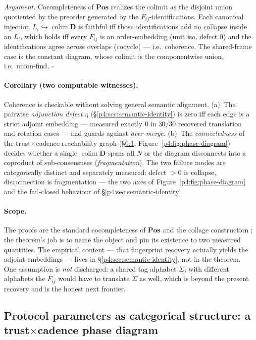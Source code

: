 \documentclass{article}
\begin{document}
\emph{Argument.} Cocompleteness of $\mathbf{Pos}$ realizes the colimit as the
disjoint union quotiented by the preorder generated by the
$F_{ij}$-identifications. Each canonical injection
$L_i\hookrightarrow\operatorname{colim}\mathbf{D}$ is faithful iff those
identifications add no collapse inside an $L_i$, which holds iff every $F_{ij}$
is an order-embedding (unit iso, defect $0$) and the identifications agree
across overlaps (cocycle) --- i.e.\ coherence. The shared-frame case is the
constant diagram, whose colimit is the componentwise union, i.e.\ union-find.
\hfill$\square$

\paragraph{Corollary (two computable witnesses).} Coherence is checkable
without solving general semantic alignment. (a)~The pairwise \emph{adjunction
defect} $\eta$ (\S\ref{p4:sec:semantic-identity}) is zero iff each edge is a strict
adjoint embedding --- measured exactly $0$ in $30/30$ recovered translation and
rotation cases --- and guards against \emph{over-merge}. (b)~The
\emph{connectedness} of the trust$\times$cadence reachability graph
(\S\ref{p4:sec:phase-diagram}, Figure~\ref{p4:fig:phase-diagram}) decides whether a
single $\operatorname{colim}\mathbf{D}$ spans all $N$ or the diagram
disconnects into a coproduct of sub-consensuses (\emph{fragmentation}). The two
failure modes are categorically distinct and separately measured: defect $>0$
is collapse, disconnection is fragmentation --- the two axes of
Figure~\ref{p4:fig:phase-diagram} and the fail-closed behaviour of
\S\ref{p4:sec:semantic-identity}.

\paragraph{Scope.} The proofs are the standard cocompleteness of $\mathbf{Pos}$
and the collage construction \citep{maclane1998categories}; the theorem's job
is to name the object and pin its existence to two measured quantities. The
empirical content --- that fingerprint recovery actually yields the adjoint
embeddings --- lives in \S\ref{p4:sec:semantic-identity}, not in the theorem. One
assumption is \emph{not} discharged: a shared tag alphabet $\Sigma$; with
different alphabets the $F_{ij}$ would have to translate $\Sigma$ as well,
which is beyond the present recovery and is the honest next frontier.

\subsection{Protocol parameters as categorical structure: a trust\texorpdfstring{$\times$}{x}cadence phase diagram}
\label{p4:sec:phase-diagram}
\end{document}
